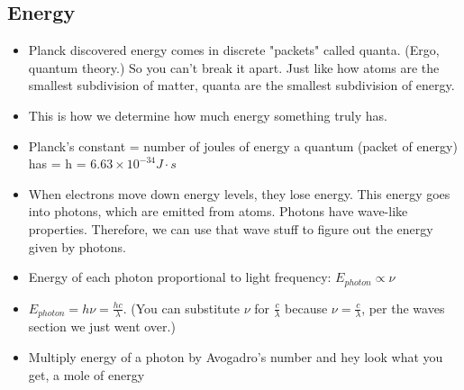 \documentclass[letterpaper, 12pt]{article}
\begin{document}
	\subsection{Energy}
	\begin{itemize}
		\item Planck discovered energy comes in discrete "packets" called quanta. (Ergo, quantum theory.) So you can't break it apart. Just like how atoms are the smallest subdivision of matter, quanta are the smallest subdivision of energy.
		\item This is how we determine how much energy something truly has.
		\item Planck's constant = number of joules of energy a quantum (packet of energy) has = h = $6.63 \times 10^{-34} J \cdot s$
		\item When electrons move down energy levels, they lose energy. This energy goes into photons, which are emitted from atoms. Photons have wave-like properties. Therefore, we can use that wave stuff to figure out the energy given by photons.
		\item Energy of each photon proportional to light frequency: $E_{photon} \propto \nu$
		\item $E_{photon} = h \nu = \frac{hc}{\lambda}$. (You can substitute $\nu$ for $\frac{c}{\lambda}$ because $\nu = \frac{c}{\lambda}$, per the waves section we just went over.)
		\item Multiply energy of a photon by Avogadro's number and hey look what you get, a mole of energy
	\end{itemize}
\end{document}

